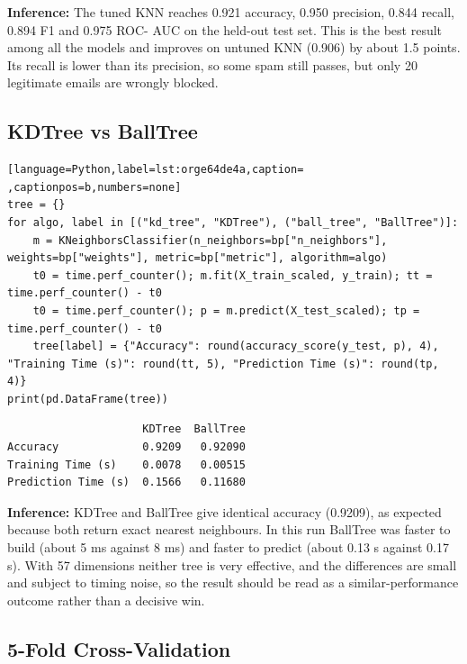 \documentclass[11pt]{article}
\begin{document}
\textbf{Inference:} The tuned KNN reaches 0.921 accuracy, 0.950 precision, 0.844 recall, 0.894 F1 and 0.975 ROC-
AUC on the held-out test set. This is the best result among all the models and improves on
untuned KNN (0.906) by about 1.5 points. Its recall is lower than its precision, so some
spam still passes, but only 20 legitimate emails are wrongly blocked.

\subsection*{KDTree vs BallTree}
\label{sec:org51911fa}

\begin{lstlisting}[language=Python,label=lst:orge64de4a,caption= ,captionpos=b,numbers=none]
tree = {}
for algo, label in [("kd_tree", "KDTree"), ("ball_tree", "BallTree")]:
    m = KNeighborsClassifier(n_neighbors=bp["n_neighbors"], weights=bp["weights"], metric=bp["metric"], algorithm=algo)
    t0 = time.perf_counter(); m.fit(X_train_scaled, y_train); tt = time.perf_counter() - t0
    t0 = time.perf_counter(); p = m.predict(X_test_scaled); tp = time.perf_counter() - t0
    tree[label] = {"Accuracy": round(accuracy_score(y_test, p), 4), "Training Time (s)": round(tt, 5), "Prediction Time (s)": round(tp, 4)}
print(pd.DataFrame(tree))
\end{lstlisting}

\begin{verbatim}
                     KDTree  BallTree
Accuracy             0.9209   0.92090
Training Time (s)    0.0078   0.00515
Prediction Time (s)  0.1566   0.11680
\end{verbatim}


\textbf{Inference:} KDTree and BallTree give identical accuracy (0.9209), as expected because both return exact
nearest neighbours. In this run BallTree was faster to build (about 5 ms against 8 ms) and
faster to predict (about 0.13 s against 0.17 s). With 57 dimensions neither tree is very
effective, and the differences are small and subject to timing noise, so the result should
be read as a similar-performance outcome rather than a decisive win.

\subsection*{5-Fold Cross-Validation}
\label{sec:org9c2b654}
\end{document}
